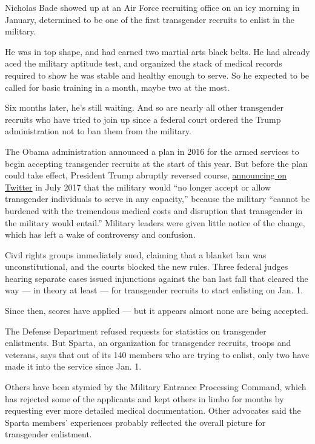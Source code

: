 Nicholas Bade showed up at an Air Force recruiting office on an icy
morning in January, determined to be one of the first transgender
recruits to enlist in the military.

He was in top shape, and had earned two martial arts black belts. He had
already aced the military aptitude test, and organized the stack of
medical records required to show he was stable and healthy enough to
serve. So he expected to be called for basic training in a month, maybe
two at the most.

Six months later, he's still waiting. And so are nearly all other
transgender recruits who have tried to join up since a federal court
ordered the Trump administration not to ban them from the military.

The Obama administration announced a plan in 2016 for the armed services
to begin accepting transgender recruits at the start of this year. But
before the plan could take effect, President Trump abruptly reversed
course,
\href{https://twitter.com/i/moments/890200249884651520?lang=en}{announcing
on Twitter} in July 2017 that the military would ``no longer accept or
allow transgender individuals to serve in any capacity,'' because the
military ``cannot be burdened with the tremendous medical costs and
disruption that transgender in the military would entail.'' Military
leaders were given little notice of the change, which has left a wake of
controversy and confusion.

Civil rights groups immediately sued, claiming that a blanket ban was
unconstitutional, and the courts blocked the new rules. Three federal
judges hearing separate cases issued injunctions against the ban last
fall that cleared the way --- in theory at least --- for transgender
recruits to start enlisting on Jan. 1.

Since then, scores have applied --- but it appears almost none are being
accepted.

The Defense Department refused requests for statistics on transgender
enlistments. But Sparta, an organization for transgender recruits,
troops and veterans, says that out of its 140 members who are trying to
enlist, only two have made it into the service since Jan. 1.

Others have been stymied by the Military Entrance Processing Command,
which has rejected some of the applicants and kept others in limbo for
months by requesting ever more detailed medical documentation. Other
advocates said the Sparta members' experiences probably reflected the
overall picture for transgender enlistment.

